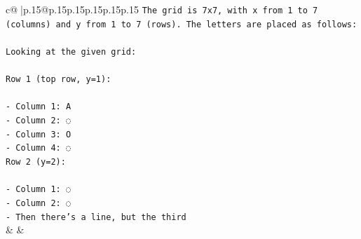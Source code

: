 \documentclass{article}
\begin{document}
{\begin{supertabular}{c@{$\;$}|p{.15\linewidth}@{}p{.15\linewidth}p{.15\linewidth}p{.15\linewidth}p{.15\linewidth}p{.15\linewidth}}
{{{\texttt{The grid is 7x7, with x from 1 to 7 (columns) and y from 1 to 7 (rows). The letters are placed as follows:} \\
\\ 
\texttt{Looking at the given grid:} \\
\\ 
\texttt{Row 1 (top row, y=1):} \\
\\ 
\texttt{{-} Column 1: A} \\
\texttt{{-} Column 2: ◌} \\
\texttt{{-} Column 3: O} \\
\texttt{{-} Column 4: ◌} \\
\texttt{Row 2 (y=2):} \\
\\ 
\texttt{{-} Column 1: ◌} \\
\texttt{{-} Column 2: ◌} \\
\texttt{{-} Then there's a line, but the third} \\
            }
        }
    }
    & & \\ \\


\end{supertabular}}
\end{document}
